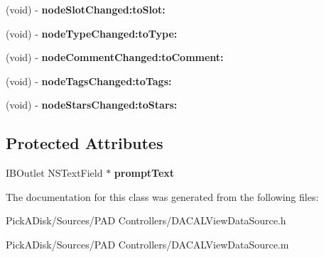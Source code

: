 \begin{DoxyCompactItemize}
\item 
\hypertarget{interface_d_a_c_a_l_view_data_source_a3a6b6eeca688305b47be064236e49ba8}{
(void) -\/ {\bfseries nodeSlotChanged:toSlot:}}
\label{interface_d_a_c_a_l_view_data_source_a3a6b6eeca688305b47be064236e49ba8}

\item 
\hypertarget{interface_d_a_c_a_l_view_data_source_a56fbe8d490d9d8b89960245dacc2863d}{
(void) -\/ {\bfseries nodeTypeChanged:toType:}}
\label{interface_d_a_c_a_l_view_data_source_a56fbe8d490d9d8b89960245dacc2863d}

\item 
\hypertarget{interface_d_a_c_a_l_view_data_source_a91822f3c53ce4c7a1a7b69adf0a26815}{
(void) -\/ {\bfseries nodeCommentChanged:toComment:}}
\label{interface_d_a_c_a_l_view_data_source_a91822f3c53ce4c7a1a7b69adf0a26815}

\item 
\hypertarget{interface_d_a_c_a_l_view_data_source_a18783204fb7f439f77ea28181d73ffec}{
(void) -\/ {\bfseries nodeTagsChanged:toTags:}}
\label{interface_d_a_c_a_l_view_data_source_a18783204fb7f439f77ea28181d73ffec}

\item 
\hypertarget{interface_d_a_c_a_l_view_data_source_a6927603a68de9283b317ea0ad0eef50f}{
(void) -\/ {\bfseries nodeStarsChanged:toStars:}}
\label{interface_d_a_c_a_l_view_data_source_a6927603a68de9283b317ea0ad0eef50f}

\end{DoxyCompactItemize}
\subsection*{Protected Attributes}
\begin{DoxyCompactItemize}
\item 
\hypertarget{interface_d_a_c_a_l_view_data_source_ac9ae8e5ae5b7801a2f954edc1e7b196c}{
IBOutlet NSTextField $\ast$ {\bfseries promptText}}
\label{interface_d_a_c_a_l_view_data_source_ac9ae8e5ae5b7801a2f954edc1e7b196c}

\end{DoxyCompactItemize}


The documentation for this class was generated from the following files:\begin{DoxyCompactItemize}
\item 
PickADisk/Sources/PAD Controllers/DACALViewDataSource.h\item 
PickADisk/Sources/PAD Controllers/DACALViewDataSource.m\end{DoxyCompactItemize}
